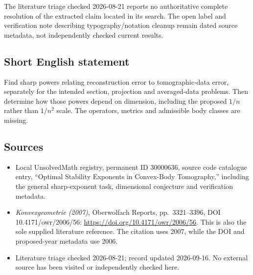 \documentclass[11pt]{article}
\begin{document}
The literature triage checked 2026-08-21 reports no authoritative complete resolution of the extracted claim located in its search. The open label and verification note describing typography/notation cleanup remain dated source metadata, not independently checked current results.
\subsection{Short English statement}
Find sharp powers relating reconstruction error to tomographic-data error, separately for the intended section, projection and averaged-data problems. Then determine how those powers depend on dimension, including the proposed \(1/n\) rather than \(1/n^2\) scale. The operators, metrics and admissible body classes are missing.
\subsection{Sources}
\begin{itemize}
\item Local UnsolvedMath registry, permanent ID 30000636, source code catalogue entry, ``Optimal Stability Exponents in Convex-Body Tomography,'' including the general sharp-exponent task, dimensional conjecture and verification metadata.
\item \emph{Konvexgeometrie (2007)}, Oberwolfach Reports, pp.\ 3321--3396, DOI 10.4171/owr/2006/56: \url{https://doi.org/10.4171/owr/2006/56}. This is also the sole supplied literature reference. The citation uses 2007, while the DOI and proposed-year metadata use 2006.
\item Literature triage checked 2026-08-21; record updated 2026-09-16. No external source has been visited or independently checked here.
\end{itemize}
\end{document}
